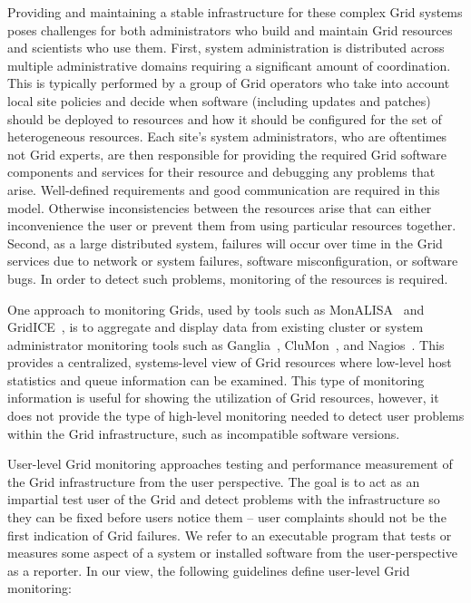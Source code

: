 \documentclass[times,10pt,twocolumn]{article}
\begin{document}
Providing and maintaining a stable infrastructure for these complex 
Grid systems poses challenges for both administrators who build and
maintain Grid resources and scientists who use them.  First, system
administration is distributed across multiple administrative domains 
requiring a significant amount of coordination.  This is typically performed by
a group of Grid operators who take into account local site policies 
and decide when software (including updates and patches) should be deployed to
resources and how it should be configured for the set of heterogeneous
resources.  Each site's system administrators, who are oftentimes not Grid
experts, are then responsible for providing the required Grid software
components and services for their resource and debugging any problems that
arise.  Well-defined requirements and good communication are required in this
model.  Otherwise inconsistencies between the resources arise that can either
inconvenience the user or prevent them from using particular resources
together.  Second, as a large distributed system, failures will occur over
time in the Grid services due to network or system failures, software
misconfiguration, or software bugs.  In order to detect such problems, 
monitoring of the resources is required.  

One approach to monitoring Grids, used by tools such as
MonALISA~\cite{monalisa} and GridICE~\cite{gridice}, is to aggregate and
display data from existing cluster or system administrator monitoring tools
such as Ganglia~\cite{ganglia}, CluMon~\cite{clumon}, and
Nagios~\cite{nagios}.  This provides a centralized, systems-level view of Grid
resources where low-level host statistics and queue information can be
examined.  This type of monitoring information is useful for showing the
utilization of Grid resources, however, it does not provide the type of
high-level monitoring needed to detect user problems within the Grid
infrastructure, such as incompatible software versions.  

User-level Grid monitoring approaches testing and performance measurement of
the Grid infrastructure from the user perspective.  The goal is to act as an
impartial test user of the Grid and detect problems with the infrastructure so
they can be fixed before users notice them -- user complaints should not be
the first indication of Grid failures.  We refer to an executable program that
tests or measures some aspect of a system or installed software from the
user-perspective as a reporter.  In our view, the following guidelines 
define user-level Grid monitoring: 
\end{document}
